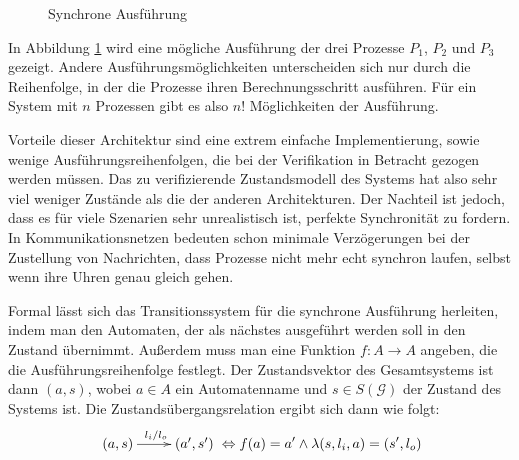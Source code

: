 \begin{figure}[h]
  \centering
  \caption{Synchrone Ausführung}
  \label{fig:synchronized_execution}
\end{figure}

In Abbildung \ref{fig:synchronized_execution} wird eine mögliche Ausführung der drei Prozesse $P_1$, $P_2$ und $P_3$ gezeigt.
Andere Ausführungsmöglichkeiten unterscheiden sich nur durch die Reihenfolge, in der die Prozesse ihren Berechnungsschritt ausführen.
Für ein System mit $n$ Prozessen gibt es also $n!$ Möglichkeiten der Ausführung.

Vorteile dieser Architektur sind eine extrem einfache Implementierung, sowie wenige Ausführungsreihenfolgen, die bei der Verifikation in Betracht gezogen werden müssen.
Das zu verifizierende Zustandsmodell des Systems hat also sehr viel weniger Zustände als die der anderen Architekturen.
Der Nachteil ist jedoch, dass es für viele Szenarien sehr unrealistisch ist, perfekte Synchronität zu fordern.
In Kommunikationsnetzen bedeuten schon minimale Verzögerungen bei der Zustellung von Nachrichten, dass Prozesse nicht mehr echt synchron laufen, selbst wenn ihre Uhren genau gleich gehen.

Formal lässt sich das Transitionssystem für die synchrone Ausführung herleiten, indem man den Automaten, der als nächstes ausgeführt werden soll in den Zustand übernimmt.
Außerdem muss man eine Funktion $f : A\rightarrow A$ angeben, die die Ausführungsreihenfolge festlegt.
Der Zustandsvektor des Gesamtsystems ist dann $(a,s)$, wobei $a\in A$ ein Automatenname und $s\in S(\mathcal{G})$ der Zustand des Systems ist.
Die Zustandsübergangsrelation ergibt sich dann wie folgt:
\[ \xymatrix { (a,s) \ar[r]^{l_i/l_o} & (a',s') } \Leftrightarrow f(a)=a'\land \lambda(s,l_i,a) = (s',l_o) \]

